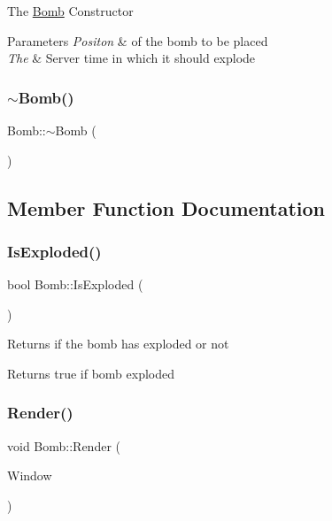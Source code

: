 The \hyperlink{class_bomb}{Bomb} Constructor


\begin{DoxyParams}{Parameters}
{\em Positon} & of the bomb to be placed \\
\hline
{\em The} & Server time in which it should explode \\
\hline
\end{DoxyParams}
\hypertarget{class_bomb_acbb47327cfb2fa429887774ef3597965}{}\label{class_bomb_acbb47327cfb2fa429887774ef3597965} 
\subsubsection{\texorpdfstring{$\sim$\+Bomb()}{~Bomb()}}
{\footnotesize\ttfamily Bomb\+::$\sim$\+Bomb (\begin{DoxyParamCaption}{ }\end{DoxyParamCaption})}



\subsection{Member Function Documentation}
\hypertarget{class_bomb_a787ba65ab16bdcb5ff622ff2395e743f}{}\label{class_bomb_a787ba65ab16bdcb5ff622ff2395e743f} 
\subsubsection{\texorpdfstring{Is\+Exploded()}{IsExploded()}}
{\footnotesize\ttfamily bool Bomb\+::\+Is\+Exploded (\begin{DoxyParamCaption}{ }\end{DoxyParamCaption})\hspace{0.3cm}{\ttfamily [inline]}}

Returns if the bomb has exploded or not \begin{DoxyReturn}{Returns}
true if bomb exploded 
\end{DoxyReturn}
\hypertarget{class_bomb_af676fc06d6ede72f26fe4d7602e41ffa}{}\label{class_bomb_af676fc06d6ede72f26fe4d7602e41ffa} 
\subsubsection{\texorpdfstring{Render()}{Render()}}
{\footnotesize\ttfamily void Bomb\+::\+Render (\begin{DoxyParamCaption}\item[{sf\+::\+Render\+Window $\ast$}]{Window }\end{DoxyParamCaption})}

